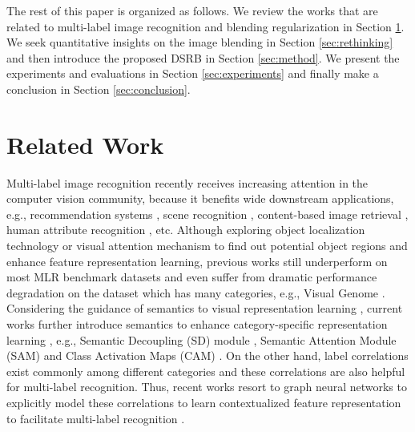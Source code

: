\documentclass[lettersize,journal]{IEEEtran}
\begin{document}
The rest of this paper is organized as follows. We review the works that are related to multi-label image recognition and blending regularization in Section \ref{sec:related}. We seek quantitative insights on the image blending in Section \ref{sec:rethinking} and then introduce the proposed DSRB in Section \ref{sec:method}. We present the experiments and evaluations in Section \ref{sec:experiments} and finally make a conclusion in Section \ref{sec:conclusion}.

\section{Related Work} \label{sec:related}

Multi-label image recognition \cite{Wu2020AdaHGNN, Ridnik2021ASL, Gao2021MCAR, Chen2022KGGR} recently receives increasing attention in the computer vision community, because it benefits wide downstream applications, e.g., recommendation systems \cite{Carrillo2013Multi, Zheng2014Context}, scene recognition \cite{Chen2019RoadScene, zhang2020relational, LiuWL15tcyb}, content-based image retrieval \cite{Li2010Technique, Zhang2021Instance}, human attribute recognition \cite{Guo2019Visual, Zhu2017Multi,Chen2021Cross}, etc. Although exploring object localization technology \cite{wei2016hcp} or visual attention mechanism \cite{wang2017multi,chen2018recurrent} to find out potential object regions and enhance feature representation learning, previous works still underperform on most MLR benchmark datasets and even suffer from dramatic performance degradation on the dataset which has many categories, e.g., Visual Genome \cite{Krishna2017VG}. Considering the guidance of semantics to visual representation learning \cite{chen2021hsva}, current works further introduce semantics to enhance category-specific representation learning \cite{Chen2019SSGRL, Wu2020AdaHGNN}, e.g., Semantic Decoupling (SD) module \cite{Chen2019SSGRL, Wu2020AdaHGNN}, Semantic Attention Module (SAM) \cite{Ye2020ADD-GCN} and Class Activation Maps (CAM) \cite{Gao2021MCAR}. On the other hand, label correlations exist commonly among different categories and these correlations are also helpful for multi-label recognition. Thus, recent works resort to graph neural networks \cite{AbadalJGLA22csur,ChenCHWLL20aaai} to explicitly model these correlations to learn contextualized feature representation to facilitate multi-label recognition \cite{Chen2019ML-GCN, Chen2019SSGRL, Wu2020AdaHGNN, Ye2020ADD-GCN, Chen2022KGGR}.
\end{document}
